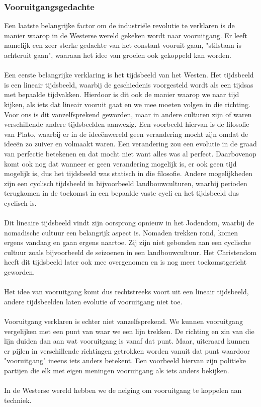 \documentclass[../summary.tex]{subfiles}
\begin{document}
	\subsubsection{Vooruitgangsgedachte}
	Een laatste belangrijke factor om de industriële revolutie te verklaren is de manier waarop in de Westerse wereld gekeken wordt naar vooruitgang. Er leeft namelijk een zeer sterke gedachte van het constant vooruit gaan, "stilstaan is achteruit gaan", waaraan het idee van groeien ook gekoppeld kan worden.\\
	\\
	Een eerste belangrijke verklaring is het tijdsbeeld van het Westen. Het tijdsbeeld is een lineair tijdsbeeld, waarbij de geschiedenis voorgesteld wordt als een tijdsas met bepaalde tijdvakken. Hierdoor is dit ook de manier waarop we naar tijd kijken, als iets dat lineair vooruit gaat en we mee moeten volgen in die richting. Voor ons is dit vanzelfsprekend geworden, maar in andere culturen zijn of waren verschillende andere tijdsbeelden aanwezig. Een voorbeeld hiervan is de filosofie van Plato, waarbij er in de ideeënwereld geen verandering mocht zijn omdat de ideeën zo zuiver en volmaakt waren. Een verandering zou een evolutie in de graad van perfectie betekenen en dat mocht niet want alles was al perfect. Daarbovenop komt ook nog dat wanneer er geen verandering mogelijk is, er ook geen tijd mogelijk is, dus het tijdsbeeld was statisch in die filosofie. Andere mogelijkheden zijn een cyclisch tijdsbeeld in bijvoorbeeld landbouwculturen, waarbij perioden terugkomen in de toekomst in een bepaalde vaste cycli en het tijdsbeeld dus cyclisch is.\\
	\\
	Dit lineaire tijdsbeeld vindt zijn oorsprong opnieuw in het Jodendom, waarbij de nomadische cultuur een belangrijk aspect is. Nomaden trekken rond, komen ergens vandaag en gaan ergens naartoe. Zij zijn niet gebonden aan een cyclische cultuur zoals bijvoorbeeld de seizoenen in een landbouwcultuur. Het Christendom heeft dit tijdsbeeld later ook mee overgenomen en is nog meer toekomstgericht geworden.\\
	\\
	Het idee van vooruitgang komt dus rechtstreeks voort uit een lineair tijdsbeeld, andere tijdsbeelden laten evolutie of vooruitgang niet toe. \\
	\\
	Vooruitgang verklaren is echter niet vanzelfsprekend. We kunnen vooruitgang vergelijken met een punt van waar we een lijn trekken. De richting en zin van die lijn duiden dan aan wat vooruitgang is vanaf dat punt. Maar, uiteraard kunnen er pijlen in verschillende richtingen getrokken worden vanuit dat punt waardoor "vooruitgang" ineens iets anders betekent. Een voorbeeld hiervan zijn politieke partijen die elk met eigen meningen vooruitgang als iets anders bekijken.\\
	\\
	In de Westerse wereld hebben we de neiging om vooruitgang te koppelen aan techniek. 
	
\end{document}

